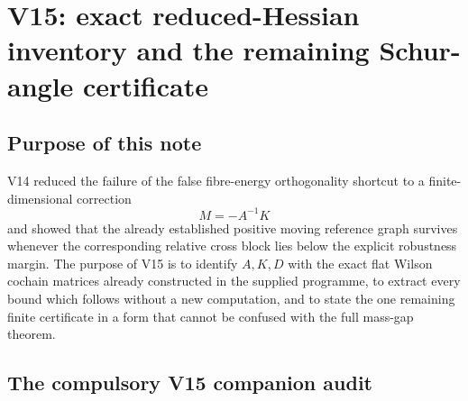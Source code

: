 \documentclass[11pt,oneside]{book}
\theoremstyle{definition}
\theoremstyle{remark}
\begin{document}


\section{V15: exact reduced-Hessian inventory and the remaining Schur-angle
certificate}
\label{sec:e8v15}

\subsection{Purpose of this note}

V14 reduced the failure of the false fibre-energy orthogonality
shortcut to a finite-dimensional correction
\[
        M=-A^{-1}K
\]
and showed that the already established positive moving reference graph
survives whenever the corresponding relative cross block lies below the
explicit robustness margin.  The purpose of V15 is to identify \(A,K,D\)
with the exact flat Wilson cochain matrices already constructed in the
supplied programme, to extract every bound which follows without a new
computation, and to state the one remaining finite certificate in a
form that cannot be confused with the full mass-gap theorem.

\subsection{The compulsory V15 companion audit}
\end{document}
